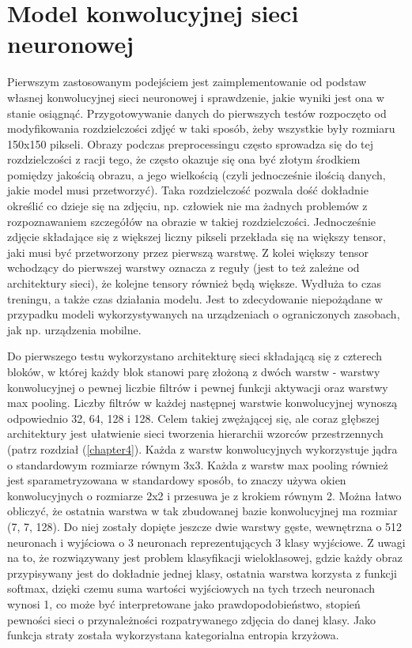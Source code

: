 \section{Model konwolucyjnej sieci neuronowej}
Pierwszym zastosowanym podejściem jest zaimplementowanie od podstaw własnej konwolucyjnej sieci neuronowej i sprawdzenie, jakie wyniki jest ona w stanie osiągnąć. Przygotowywanie danych do pierwszych testów rozpoczęto od modyfikowania rozdzielczości zdjęć w taki sposób, żeby wszystkie były rozmiaru 150x150 pikseli. Obrazy podczas preprocessingu często sprowadza się do tej rozdzielczości z racji tego, że często okazuje się ona być złotym środkiem pomiędzy jakością obrazu, a jego wielkością (czyli jednocześnie ilością danych, jakie model musi przetworzyć). Taka rozdzielczość pozwala dość dokładnie określić co dzieje się na zdjęciu, np. człowiek nie ma żadnych problemów z rozpoznawaniem szczegółów na obrazie w takiej rozdzielczości. Jednocześnie zdjęcie składające się z większej liczny pikseli przekłada się na większy tensor, jaki musi być przetworzony przez pierwszą warstwę. Z kolei większy tensor wchodzący do pierwszej warstwy oznacza z reguły (jest to też zależne od architektury sieci), że kolejne tensory również będą większe. Wydłuża to czas treningu, a także czas działania modelu. Jest to zdecydowanie niepożądane w przypadku modeli wykorzystywanych na urządzeniach o ograniczonych zasobach, jak np. urządzenia mobilne.

Do pierwszego testu wykorzystano architekturę sieci składającą się z czterech bloków, w której każdy blok stanowi parę złożoną z dwóch warstw - warstwy konwolucyjnej o pewnej liczbie filtrów i pewnej funkcji aktywacji oraz warstwy max pooling. Liczby filtrów w każdej następnej warstwie konwolucyjnej wynoszą odpowiednio 32, 64, 128 i 128. Celem takiej zwężającej się, ale coraz głębszej architektury jest ułatwienie sieci tworzenia hierarchii wzorców przestrzennych (patrz rozdział (\ref{chapter4}). Każda z warstw konwolucyjnych wykorzystuje jądra o standardowym rozmiarze równym 3x3. Każda z warstw max pooling również jest sparametryzowana w standardowy sposób, to znaczy używa okien konwolucyjnych o rozmiarze 2x2 i przesuwa je z krokiem równym 2. Można łatwo obliczyć, że ostatnia warstwa w tak zbudowanej bazie konwolucyjnej ma rozmiar (7, 7, 128). Do niej zostały dopięte jeszcze dwie warstwy gęste, wewnętrzna o 512 neuronach i wyjściowa o 3 neuronach reprezentujących 3 klasy wyjściowe. Z uwagi na to, że rozwiązywany jest problem klasyfikacji wieloklasowej, gdzie każdy obraz przypisywany jest do dokładnie jednej klasy, ostatnia warstwa korzysta z funkcji softmax, dzięki czemu suma wartości wyjściowych na tych trzech neuronach wynosi 1, co może być interpretowane jako prawdopodobieństwo, stopień pewności sieci o przynależności rozpatrywanego zdjęcia do danej klasy. Jako funkcja straty została wykorzystana kategorialna entropia krzyżowa.


